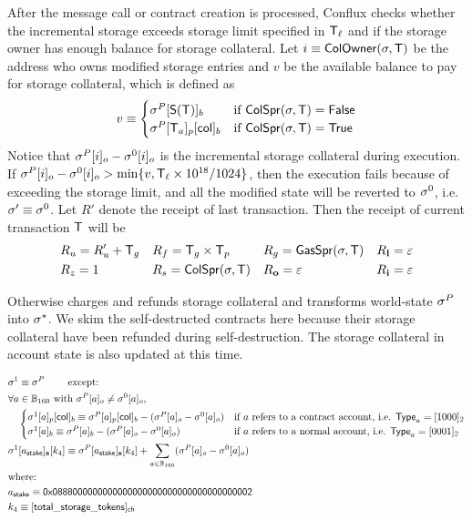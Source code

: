 After the message call or contract creation is processed, Conflux checks whether the incremental storage exceeds storage limit specified in $\textsf{T}_\ell$ and if the storage owner has enough balance for storage collateral. 
Let $i\equiv \mathsf{ColOwner}(\mathbf{\sigma},\textsf{T})$ be the address who owns modified storage entries and $v$ be the available balance to pay for storage collateral, which is defined as 
\begin{align}
	v \equiv \begin{cases}
		\mathbf{\sigma}^{P}[\mathsf{S}{\left({\textsf{T}} \right)}]_b & \text{if }\mathsf{ColSpr}(\mathbf{\sigma},\textsf{T})=\mathsf{False} \\
		\mathbf{\sigma}^{P}[\textsf{T}_a]_p[{\sf col}]_b &  \text{if }\mathsf{ColSpr}(\mathbf{\sigma},\textsf{T})=\mathsf{True}
	\end{cases}
\end{align}
%
Notice that $\mathbf{\sigma}^P[i]_o-\mathbf{\sigma}^0[i]_o$ is the incremental storage collateral during execution.
If $\mathbf{\sigma}^P[i]_o-\mathbf{\sigma}^0[i]_o>\min\{v,\textsf{T}_\ell\times 10^{18}/1024\}$, then the execution fails because of exceeding the storage limit, 
and all the modified state will be reverted to $\mathbf{\sigma}^0$, 
i.e. $\mathbf{\sigma}'\equiv\mathbf{\sigma}^0$. 
Let $R'$ denote the receipt of last transaction.
Then the receipt of current transaction $\textsf{T}$ will be 
\begin{align}
	&R_u=R'_u+\textsf{T}_g && R_f = \textsf{T}_g\times\textsf{T}_p && R_g = \mathsf{GasSpr}(\mathbf{\sigma},\textsf{T}) && R_{\bf l}=\mathbb{\varepsilon} \\
	&R_z=1 && R_s = \mathsf{ColSpr}(\mathbf{\sigma},\textsf{T}) && R_{\bf o}=\mathbb{\varepsilon} && R_{\bf i}=\mathbb{\varepsilon}
\end{align}

Otherwise \name charges and refunds storage collateral and transforms world-state $\mathbf{\sigma}^P$ into $\mathbf{\sigma}^*$. 
We skim the self-destructed contracts here because their storage collateral have been refunded during self-destruction. 
The storage collateral in account state is also updated at this time. 

\begin{align}
	&\st^1  \eqdef \st^{P} \qquad \mbox{  except:}\\
	&\forall a \in \B_{160} \text{ with } \st^{P}[a]_o\neq\st^0[a]_o, \\
	&\quad \begin{cases}
	\st^1[a]_p[{\sf col}]_b \eqdef \st^{P}[a]_p[{\sf col}]_b - (\st^{P}[a]_o-\st^0[a]_o) & \mbox{if $a$ refers to a contract account, i.e. $\mathsf{Type}_{a}=\typecontract$} \\
	\st^1[a]_b \eqdef \st^{P}[a]_b - (\st^{P}[a]_o-\st^0[a]_o) & \mbox{if $a$ refers to a normal account, i.e. $\mathsf{Type}_{a}= \typenormal$}
	\end{cases}\\
	&\st^1[a_{\sf stake}]_{\bf s}[k_4] \eqdef \st^P[a_{\sf stake}]_{\bf s}[k_4] + \sum_{a\in \B_{160}}(\st^{P}[a]_o-\st^0[a]_o) \\
	&\mbox{where:}  \\
	&a_{\sf stake} \eqdef \stakingcontract \\ 
	&k_4 \eqdef {\sf [total\char`_storage\char`_tokens]_{\sf ch}} 
\end{align}

